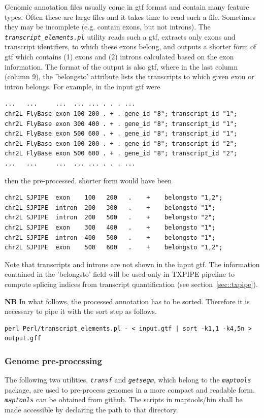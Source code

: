 \documentclass{article}
\newcommand{\prog}[1]{{\tt\em #1}}
\begin{document}
Genomic annotation files usually come in gtf format and contain many feature types. Often these are large files and it takes time to read such a file. 
Sometimes they may be incomplete (e.g. contain exons, but not introns). The \prog{transcript\_elements.pl} utility reads such a gtf, extracts only
exons and transcript identifiers, to which these exons belong, and outputs a shorter form of gtf which contains (1) exons and (2) introns calculated 
based on the exon information. The format of the output is also gtf, where in the last column (column 9), the 'belongsto' attribute lists the transcripts 
to which given exon or intron belongs. For example, in the input gtf were
\begin{verbatim} 
...   ...     ...  ... ... . . . ...      
chr2L FlyBase exon 100 200 . + . gene_id "8"; transcript_id "1";
chr2L FlyBase exon 300 400 . + . gene_id "8"; transcript_id "1"; 
chr2L FlyBase exon 500 600 . + . gene_id "8"; transcript_id "1"; 
chr2L FlyBase exon 100 200 . + . gene_id "8"; transcript_id "2"; 
chr2L FlyBase exon 500 600 . + . gene_id "8"; transcript_id "2"; 
...   ...     ...  ... ... . . . ...
\end{verbatim}
then the pre-processed, shorter form would have been
\begin{verbatim} 
chr2L SJPIPE  exon    100   200   .    +    belongsto "1,2";
chr2L SJPIPE  intron  200   300   .    +    belongsto "1";
chr2L SJPIPE  intron  200   500   .    +    belongsto "2";
chr2L SJPIPE  exon    300   400   .    +    belongsto "1";
chr2L SJPIPE  intron  400   500   .    +    belongsto "1";
chr2L SJPIPE  exon    500   600   .    +    belongsto "1,2";
\end{verbatim}
Note that transcripts and introns are not shown in the input gtf. The information contained in the 'belongsto' field will be used only in 
TXPIPE pipeline to compute splicing indices from transcript quantification (see section~\ref{sec::txpipe}).

{\bf NB} In what follows, the processed annotation has to be sorted. Therefore it is necessary to pipe it with the sort step as follows.

\begin{verbatim} 
perl Perl/transcript_elements.pl - < input.gtf | sort -k1,1 -k4,5n > output.gff
\end{verbatim}


\subsubsection{Genome pre-processing}
The following two utilities, \prog{transf} and \prog{getsegm}, which belong to the \prog{maptools} package, are used to pre-process genomes in a more compact and
readable form. \prog{maptools} can be obtained from \href{https://github.com/pervouchine/maptools}{github}. The scripts in maptools/bin shall be made accessible
by declaring the path to that directory.
\end{document}
